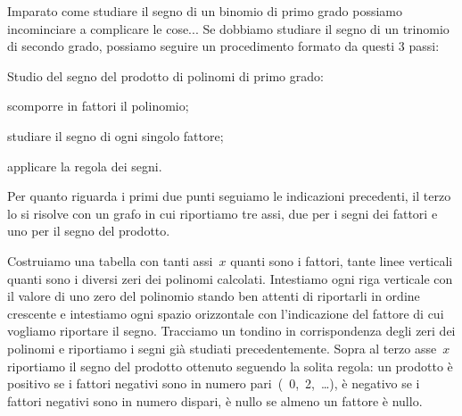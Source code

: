 Imparato come studiare il segno di un binomio di primo grado possiamo
incominciare a complicare le cose...
Se dobbiamo studiare il segno di un trinomio di secondo grado, possiamo
seguire un procedimento formato da questi 3 passi:

\begin{procedura}
 Studio del segno del prodotto di polinomi di primo grado:
\begin{enumeratea}
\item scomporre in fattori il polinomio;
\item studiare il segno di ogni singolo fattore;
\item applicare la regola dei segni.
\end{enumeratea}
\end{procedura}

Per quanto riguarda i primi due punti seguiamo le indicazioni precedenti,
il terzo lo si risolve con un grafo in cui riportiamo tre assi, due per i
segni dei fattori e uno per il segno del prodotto.

Costruiamo una tabella con tanti assi~$x$ quanti sono i fattori, tante
linee verticali quanti sono i diversi zeri dei polinomi calcolati.
Intestiamo ogni riga verticale con il valore di uno zero del polinomio
stando ben attenti
di riportarli in ordine crescente e intestiamo ogni spazio orizzontale con
l'indicazione del fattore di cui vogliamo riportare il segno.
Tracciamo un tondino in corrispondenza degli zeri dei polinomi e riportiamo
i segni già studiati precedentemente.
Sopra al terzo asse~$x$ riportiamo il segno del prodotto ottenuto
seguendo la solita regola: un prodotto è positivo se i fattori negativi
sono in numero pari~(~0,~2,~\dots), è negativo se i fattori negativi sono in
numero dispari, è nullo se almeno un fattore è nullo.

